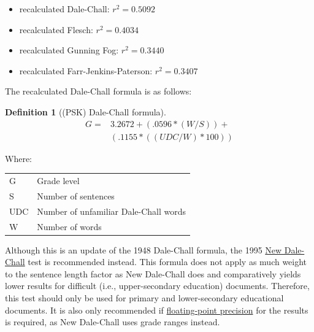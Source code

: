 \documentclass[
]{book}
\providecommand{\tightlist}{%
  \setlength{\itemsep}{0pt}\setlength{\parskip}{0pt}}
\theoremstyle{definition}
\newtheorem{definition}{Definition}[chapter]
\theoremstyle{definition}
\theoremstyle{definition}
\theoremstyle{definition}
\theoremstyle{remark}
\begin{document}
\begin{itemize}
\tightlist
\item
  recalculated Dale-Chall: \(r^2 = 0.5092\)
\item
  recalculated Flesch: \(r^2 = 0.4034\)
\item
  recalculated Gunning Fog: \(r^2 = 0.3440\)
\item
  recalculated Farr-Jenkins-Paterson: \(r^2 = 0.3407\)
\end{itemize}

The recalculated Dale-Chall formula is as follows:

\begin{definition}[(PSK) Dale-Chall formula]
\protect\hypertarget{def:pskdalechall}{}{\label{def:pskdalechall} {} }\begin{align*}
  G = & 3.2672 + (.0596*(W/S)) + \\
      & (.1155*((UDC/W)*100))
\end{align*}
\end{definition}

Where:

\begin{longtable}[]{@{}
  >{\raggedright\arraybackslash}p{}
  >{\raggedright\arraybackslash}p{}@{}}
\toprule
\endhead
G & Grade level \\
S & Number of sentences \\
UDC & Number of unfamiliar Dale-Chall words \\
W & Number of words \\
\bottomrule
\end{longtable}

Although this is an update of the 1948 Dale-Chall formula, the 1995 \protect\hyperlink{dale-chall-test}{New Dale-Chall} test is recommended instead. This formula does not apply as much weight to the sentence length factor as New Dale-Chall does and comparatively yields lower results for difficult (i.e., upper-secondary education) documents. Therefore, this test should only be used for primary and lower-secondary educational documents. It is also only recommended if \protect\hyperlink{grade-level-results}{floating-point precision} for the results is required, as New Dale-Chall uses grade ranges instead.

\end{document}
